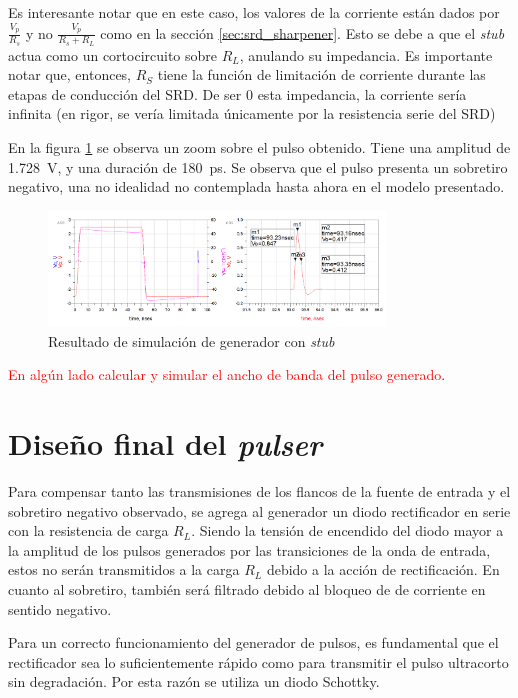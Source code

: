 Es interesante notar que en este caso, los valores de la corriente están dados
por $\frac{V_p}{R_s}$ y no $\frac{V_p}{R_s+R_L}$ como en la sección
\ref{sec:srd_sharpener}. Esto se debe a que el \textit{stub} actua como un
cortocircuito sobre $R_L$, anulando su impedancia. Es importante notar que,
entonces, $R_S$ tiene la función de limitación de corriente durante las etapas
de conducción del SRD. De ser $0$ esta impedancia, la corriente sería infinita
(en rigor, se vería limitada únicamente por la resistencia serie del SRD)

En la figura \ref{fig:stub_generator_sim_result} se observa un zoom sobre el
pulso obtenido. Tiene una amplitud de \qty{1.728}{\volt}, y una duración
de \qty{180}{\pico\second}. Se observa que el pulso presenta un sobretiro negativo, una no idealidad no
contemplada hasta ahora en el modelo presentado.

\begin{figure}[tbp]
    \centering
    \includegraphics[width=0.8\textwidth]{images/stub_generator_sim_result.png}
    \caption{Resultado de simulación de generador con \textit{stub}}
    \label{fig:stub_generator_sim_result}
\end{figure}

\textcolor{red}{En algún lado calcular y simular el ancho de banda del pulso
generado}.

\section{Diseño final del \textit{pulser}}

Para compensar tanto las transmisiones de los flancos de la fuente de entrada y
el sobretiro negativo observado, se agrega al generador un diodo rectificador en
serie con la resistencia de carga $R_L$. Siendo la tensión de encendido del
diodo mayor a la amplitud de los pulsos generados por las transiciones de la
onda de entrada, estos no serán transmitidos a la carga $R_L$ debido a la acción
de rectificación. En cuanto al sobretiro, también será filtrado debido al
bloqueo de de corriente en sentido negativo.

Para un correcto funcionamiento del generador de pulsos, es fundamental que el
rectificador sea lo suficientemente rápido como para transmitir el pulso
ultracorto sin degradación. Por esta razón se utiliza un diodo Schottky.

